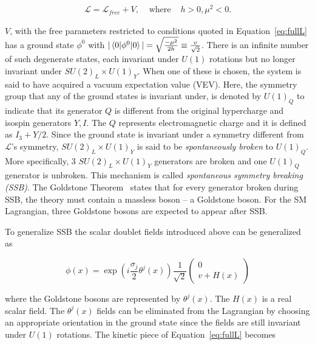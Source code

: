 \begin{equation}
\begin{aligned}
\mathcal{L} = \mathcal{L}_{free} + V, & \text{ where } & h>0,\mu^2<0.
\label{eq:fullL}
\end{aligned}
\end{equation}

$V$, with the free parameters restricted to conditions quoted in Equation~\ref{eq:fullL} has a ground state
$\phi^0$ with $|\braket{0|\phi^0|0}| = \sqrt{\frac{-\mu^2}{2h}} \equiv \frac{v}{\sqrt{2}}$. There is an infinite 
number of such degenerate states, each invariant under $U(1)$ rotations but no longer invariant under 
 $SU(2)_L\times U(1)_Y$. When one of these is chosen, the system is said to have acquired a vacuum 
expectation value (VEV). Here, the symmetry group that any of the ground states is invariant under, 
is denoted by $U(1)_Q$ to indicate that its generator $Q$ is different from the original hypercharge and 
 isospin generators $Y, I$. 
The $Q$ represents electromagnetic charge and it is defined as $I_3 + Y/2$.
 Since the ground state is invariant under a symmetry different 
from $\mathcal{L}$'s symmetry, $SU(2)_L\times U(1)_Y$ is said to be {\it spontaneously broken} to $U(1)_Q$.
More specifically, 3 $SU(2)_L\times U(1)_Y$ generators are broken and one $U(1)_Q$ generator is unbroken.  
This mechanism is called {\it spontaneous symmetry breaking (SSB)}. The Goldstone Theorem~\cite{PhysRevLett.4.380}
states that for every generator broken during SSB, the theory must contain 
a massless boson --  a Goldstone boson. For the SM Lagrangian, three Goldstone bosons are 
expected to appear after SSB. 

\par To generalize SSB the scalar doublet fields introduced above can be generalized as  

\begin{equation}
\phi(x) = \exp\left ( i\frac{\sigma_j}{2}\theta^j(x)\right )\frac{1}{\sqrt{2}}\begin{pmatrix} 0 \\ v + H(x) \end{pmatrix} 
\end{equation} 

where the Goldstone bosons are represented by $\theta^j(x)$. The $H(x)$ is a real scalar field. 
The $\theta^j(x)$ fields can be eliminated from the Lagrangian by choosing an appropriate orientation 
in the ground state since the fields are still invariant under $U(1)$ rotations. 
The kinetic piece of Equation~\ref{eq:fullL} becomes 

